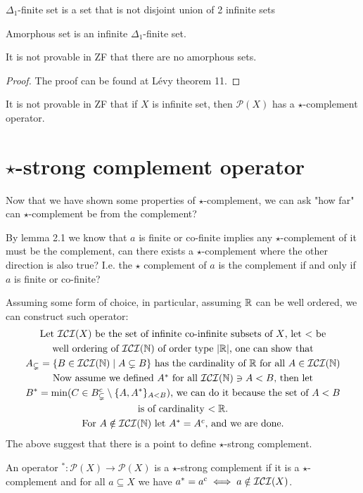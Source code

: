 	\begin{definition}
		$\Delta_1$-finite set is a set that is not disjoint union of 2 infinite sets
	\end{definition}
	\begin{definition}
		Amorphous set is an infinite $\Delta_1$-finite set.
	\end{definition}
	
	\begin{theorem}
		It is not provable in ZF that there are no amorphous sets.
	\end{theorem}
	\begin{proof}
		The proof can be found at Lévy\cite{TheIndependenceOfVariousDefinitionsOfFiniteness} theorem 11.
	\end{proof}
	
	
	\begin{corollary}
		It is not provable in ZF that if $X$ is infinite set, then $\mathcal{P}(X)$ has a $\star$-complement operator.
	\end{corollary}
	
	\section{$\star$-strong complement operator}
	
	Now that we have shown some properties of $\star$-complement, we can ask "how far" can $\star$-complement be from the complement?
	
	By lemma 2.1 we know that $a$ is finite or co-finite implies any $\star$-complement of it must be the complement, can there exists a $\star$-complement where the other direction is also true? I.e. the $\star$ complement of $a$ is the complement if and only if $a$ is finite or co-finite?
	
	Assuming some form of choice, in particular, assuming $\Bbb{R}$ can be well ordered, we can construct such operator:
	\begin{gather*}
		\mbox{Let $\mathcal{ICI}(X)$ be the set of infinite co-infinite subsets of $X$, let $<$ be}\\
		\mbox{well ordering of $\mathcal{ICI}(\Bbb N)$ of order type $|\Bbb R|$, one can show that}\\
		A_{\subsetneq}=\{B\in\mathcal{ICI}(\Bbb N)\mid A\subsetneq B\}\mbox{ has the cardinality of $\Bbb R$ for all $A\in\mathcal{ICI}(\Bbb{N})$}\\
		\mbox{Now assume we defined $A^*$ for all $\mathcal{ICI}(\Bbb N)\ni A<B$, then let}\\
		B^*=\min(C\in B^c_{\subsetneq}\setminus\{A,A^*\}_{A<B} )\mbox{, we can do it because the set of $A<B$}\\
		\mbox{is of cardinality $<\Bbb R$.}\\
		\mbox{For $A\notin \mathcal{ICI}(\Bbb N)$ let $A^*=A^c$, and we are done.}
	\end{gather*}
	The above suggest that there is a point to define $\star$-strong complement.
	\begin{definition}
		An operator $^*:\mathcal{P}(X)\to \mathcal{P}(X)$ is a $\star$-strong complement if it is a $\star$-complement and for all $a\subseteq X$ we have $a^*=a^c\iff a\notin \mathcal{ICI}(X)$.
	\end{definition}
	
